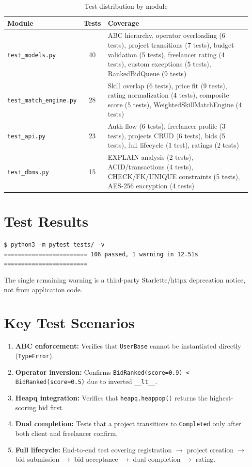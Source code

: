 \documentclass[12pt, a4paper]{report}
\begin{document}
\begin{table}[H]
\centering
\caption{Test distribution by module}
\begin{tabular}{@{}lcp{7cm}@{}}
\toprule
\textbf{Module} & \textbf{Tests} & \textbf{Coverage} \\
\midrule
\texttt{test\_models.py} & 40 & ABC hierarchy, operator overloading (6 tests), project transitions (7 tests), budget validation (5 tests), freelancer rating (4 tests), custom exceptions (5 tests), RankedBidQueue (9 tests) \\[4pt]
\texttt{test\_match\_engine.py} & 28 & Skill overlap (6 tests), price fit (9 tests), rating normalization (4 tests), composite score (5 tests), WeightedSkillMatchEngine (4 tests) \\[4pt]
\texttt{test\_api.py} & 23 & Auth flow (6 tests), freelancer profile (3 tests), projects CRUD (6 tests), bids (5 tests), full lifecycle (1 test), ratings (2 tests) \\[4pt]
\texttt{test\_dbms.py} & 15 & EXPLAIN analysis (2 tests), ACID/transactions (4 tests), CHECK/FK/UNIQUE constraints (5 tests), AES-256 encryption (4 tests) \\
\bottomrule
\end{tabular}
\end{table}

\section{Test Results}

\begin{lstlisting}[style=bashstyle, caption={Final test run output}]
$ python3 -m pytest tests/ -v
======================== 106 passed, 1 warning in 12.51s ========================
\end{lstlisting}

The single remaining warning is a third-party Starlette/httpx deprecation notice, not from application code.

\section{Key Test Scenarios}

\begin{enumerate}
  \item \textbf{ABC enforcement:} Verifies that \texttt{UserBase} cannot be instantiated directly (\texttt{TypeError}).
  \item \textbf{Operator inversion:} Confirms \texttt{BidRanked(score=0.9) < BidRanked(score=0.5)} due to inverted \texttt{\_\_lt\_\_}.
  \item \textbf{Heapq integration:} Verifies that \texttt{heapq.heappop()} returns the highest-scoring bid first.
  \item \textbf{Dual completion:} Tests that a project transitions to \texttt{Completed} only after both client and freelancer confirm.
  \item \textbf{Full lifecycle:} End-to-end test covering registration $\to$ project creation $\to$ bid submission $\to$ bid acceptance $\to$ dual completion $\to$ rating.
\end{enumerate}
\end{document}
